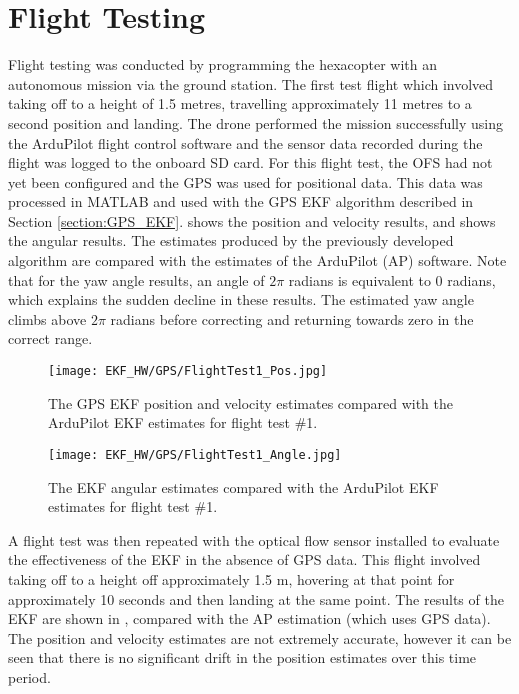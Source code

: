 \section{Flight Testing}
Flight testing was conducted by programming the hexacopter with an autonomous mission via the ground station. The first test flight  which involved taking off to a height of 1.5 metres, travelling approximately 11 metres to a second position and landing. The drone performed the mission successfully using the ArduPilot flight control software and the sensor data recorded during the flight was logged to the onboard SD card. For this flight test, the OFS had not yet been configured and the GPS was used for positional data. This data was processed in MATLAB and used with the GPS EKF algorithm described in Section \ref{section:GPS_EKF}.  shows the position and velocity results, and  shows the angular results. The estimates produced by the previously developed algorithm are compared with the estimates of the ArduPilot (AP) software. Note that for the yaw angle results, an angle of $2\pi$ radians is equivalent to 0 radians, which explains the sudden decline in these results. The estimated yaw angle climbs above $2\pi$ radians before correcting and returning towards zero in the correct range. 

\begin{figure}[htb]
	\texttt{[image: EKF\_HW/GPS/FlightTest1\_Pos.jpg]}%
	\caption{The GPS EKF position and velocity estimates compared with the ArduPilot EKF estimates for flight test \#1.}%
	\label{fig:HW_GPS_Pos}%
\end{figure}

\begin{figure}[htb]
	\texttt{[image: EKF\_HW/GPS/FlightTest1\_Angle.jpg]}%
	\caption{The EKF angular estimates compared with the ArduPilot EKF estimates for flight test \#1.}%
	\label{fig:HW_GPS_Ang}%
\end{figure}

A flight test was then repeated with the optical flow sensor installed to evaluate the effectiveness of the EKF in the absence of GPS data. This flight involved taking off to a height off approximately 1.5 m, hovering at that point for approximately 10 seconds and then landing at the same point. The results of the EKF are shown in , compared with the AP estimation (which uses GPS data). The position and velocity estimates are not extremely accurate, however it can be seen that there is no significant drift in the position estimates over this time period.

